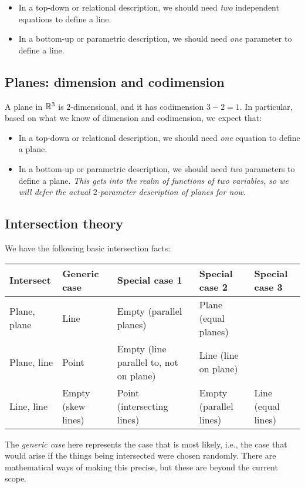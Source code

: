 \documentclass[10pt]{amsart}
\begin{document}
\begin{itemize}
\item In a top-down or relational description, we should need {\em
  two} independent equations to define a line.
\item In a bottom-up or parametric description, we should need {\em
  one} parameter to define a line.
\end{itemize}

\subsection{Planes: dimension and codimension}

A plane in $\mathbb{R}^3$ is $2$-dimensional, and it has codimension $3 - 2 =
1$. In particular, based on what we know of dimension and codimension,
we expect that:

\begin{itemize}
\item In a top-down or relational description, we should need {\em
  one} equation to define a plane.
\item In a bottom-up or parametric description, we should need {\em
  two} parameters to define a plane. {\em This gets into the realm of
  functions of two variables, so we will defer the actual
  $2$-parameter description of planes for now}.
\end{itemize}

\subsection{Intersection theory}

We have the following basic intersection facts:

\begin{tabular}{|l|l|l|l|l|}
  \hline
  Intersect & Generic case & Special case 1 & Special case 2 & Special case 3 \\
  \hline
  Plane, plane & Line & Empty (parallel planes) & Plane (equal planes) & \\
  \hline
  Plane, line & Point & Empty (line parallel to, not on plane) & Line (line on plane) & \\
  \hline
  Line, line & Empty (skew lines) & Point (intersecting lines) & Empty (parallel lines) & Line (equal lines) \\
  \hline
\end{tabular}

The {\em generic case} here represents the case that is most likely,
i.e., the case that would arise if the things being intersected were
chosen randomly. There are mathematical ways of making this precise,
but these are beyond the current scope.
\end{document}
